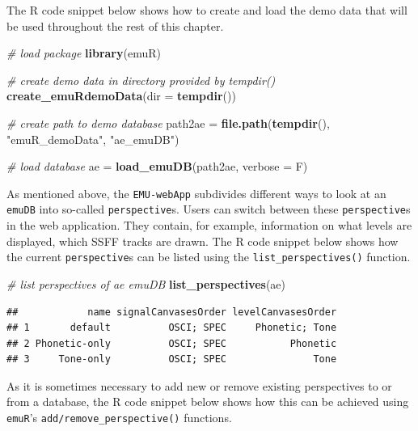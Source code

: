 \documentclass[]{book}
\newenvironment{Shaded}{\begin{snugshade}}{\end{snugshade}}
\newcommand{\CommentTok}[1]{\textcolor[rgb]{0.56,0.35,0.01}{\textit{#1}}}
\newcommand{\DataTypeTok}[1]{\textcolor[rgb]{0.13,0.29,0.53}{#1}}
\newcommand{\KeywordTok}[1]{\textcolor[rgb]{0.13,0.29,0.53}{\textbf{#1}}}
\newcommand{\NormalTok}[1]{#1}
\newcommand{\StringTok}[1]{\textcolor[rgb]{0.31,0.60,0.02}{#1}}
\begin{document}
The R code snippet below shows how to create and load the demo data that will be used throughout the rest of this chapter.

\begin{Shaded}
\begin{Highlighting}[]
\CommentTok{# load package}
\KeywordTok{library}\NormalTok{(emuR)}

\CommentTok{# create demo data in directory provided by tempdir()}
\KeywordTok{create_emuRdemoData}\NormalTok{(}\DataTypeTok{dir =} \KeywordTok{tempdir}\NormalTok{())}

\CommentTok{# create path to demo database}
\NormalTok{path2ae =}\StringTok{ }\KeywordTok{file.path}\NormalTok{(}\KeywordTok{tempdir}\NormalTok{(), }\StringTok{"emuR_demoData"}\NormalTok{, }\StringTok{"ae_emuDB"}\NormalTok{)}

\CommentTok{# load database}
\NormalTok{ae =}\StringTok{ }\KeywordTok{load_emuDB}\NormalTok{(path2ae, }\DataTypeTok{verbose =}\NormalTok{ F)}
\end{Highlighting}
\end{Shaded}

As mentioned above, the \texttt{EMU-webApp} subdivides different ways to look at an \texttt{emuDB} into so-called \texttt{perspective}s. Users can switch between these \texttt{perspective}s in the web application. They contain, for example, information on what levels are displayed, which SSFF tracks are drawn. The R code snippet below shows how the current \texttt{perspective}s can be listed using the \texttt{list\_perspectives()} function.

\begin{Shaded}
\begin{Highlighting}[]
\CommentTok{# list perspectives of ae emuDB}
\KeywordTok{list_perspectives}\NormalTok{(ae)}
\end{Highlighting}
\end{Shaded}

\begin{verbatim}
##            name signalCanvasesOrder levelCanvasesOrder
## 1       default          OSCI; SPEC     Phonetic; Tone
## 2 Phonetic-only          OSCI; SPEC           Phonetic
## 3     Tone-only          OSCI; SPEC               Tone
\end{verbatim}

As it is sometimes necessary to add new or remove existing perspectives to or from a database, the R code snippet below shows how this can be achieved using \texttt{emuR}'s \texttt{add/remove\_perspective()} functions.
\end{document}
